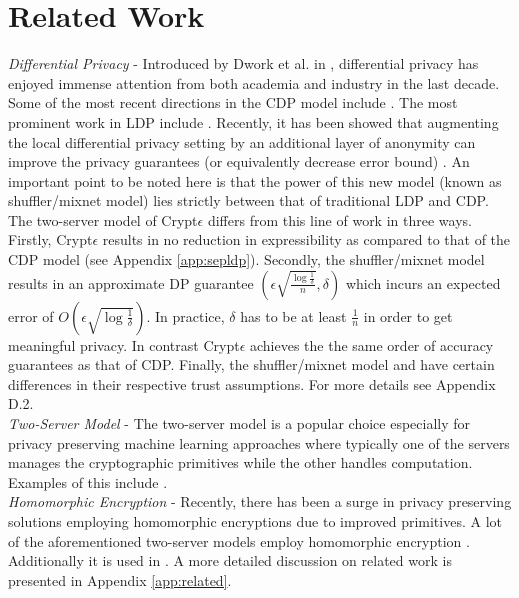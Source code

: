 \section{Related Work}\label{sec:related-short}
\textit{Differential Privacy }- Introduced by Dwork et al. in \cite{Dork}, differential privacy has enjoyed immense attention from both academia and industry in the last decade. Some of the most recent directions in the \textsf{CDP} model include \cite{MVG,Blocki,AHP,DAWA,hist1,hist2,hist3,hist4,hist6,hist7,hist8,A1,A2,A3,A4,A5,A6,A7,A8,u1,u2,MWEM}. The most prominent work in \textsf{LDP} include \cite{LDP1, LDP2, Rappor1,HH,Rappor2,HH2,Cormode, CALM,15,itemset}.
Recently, it has been showed that augmenting the local differential privacy setting by an additional layer of anonymity can improve the privacy
guarantees (or equivalently decrease error bound) \cite{mixnets,Prochlo,amplification}.  An important point to be noted here is that the power of this new model (known as shuffler/mixnet model) lies strictly between that of traditional \textsf{LDP} and \textsf{CDP}. The two-server model of Crypt$\epsilon$ differs from this line of work in three ways. Firstly, Crypt$\epsilon$ results in no reduction in expressibility as compared to that of the \textsf{CDP} model (see Appendix \ref{app:sepldp}). Secondly, the shuffler/mixnet model results in an approximate DP guarantee $(\epsilon\sqrt{\frac{\log\frac{1}{\delta}}{n}},\delta)$ which incurs an expected error of $O(\epsilon\sqrt{\log\frac{1}{\delta}})$.  In practice, $\delta$ has to be at least $\frac{1}{n}$ in order to get meaningful privacy. In contrast Crypt$\epsilon$ achieves the the same order of accuracy guarantees as that of \textsf{CDP}. Finally, the shuffler/mixnet model and \system have certain differences in their respective trust assumptions. For more details see Appendix D.2. %
\\\textit{Two-Server Model} - The two-server model is a popular choice especially for privacy preserving machine learning approaches where typically one of the servers manages the cryptographic primitives while the other handles computation. Examples of this include \cite{Boneh1,Boneh2,Ridge2,Matrix2,secureML,LReg,Ver}. \\\textit{Homomorphic Encryption } - Recently, there has been a surge in  privacy preserving solutions employing homomorphic encryptions due to improved primitives. A lot of the aforementioned two-server models employ homomorphic encryption \cite{Boneh1,Boneh2,LReg,Matrix2}.  Additionally it is used in \cite{CryptoDL,CryptoNet,NN, Irene2, grid}.
A more detailed discussion on related work is presented in Appendix \ref{app:related}.

